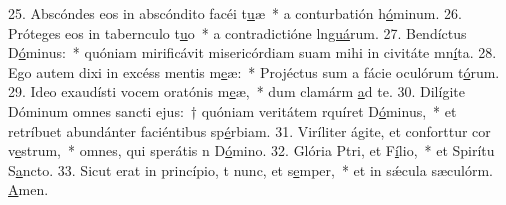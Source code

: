 25. Abscóndes eos in abscóndito facéi t\uline{u}æ~* a conturbatión h\uline{ó}minum.
26. Próteges eos in tabernculo t\uline{u}o~* a contradictióne ln\uline{guá}rum.
27. Bendíctus D\uline{ó}minus:~* quóniam mirificávit misericórdiam suam mihi in civitáte mn\uline{í}ta.
28. Ego autem dixi in excéss mentis m\uline{e}æ:~* Projéctus sum a fácie oculórum t\uline{ó}rum.
29. Ideo exaudísti vocem oratónis m\uline{e}æ,~* dum clamárm \uline{a}d te.
30. Dilígite Dóminum omnes sancti ejus:~† quóniam veritátem rquíret D\uline{ó}minus,~* et retríbuet abundánter faciéntibus sp\uline{é}rbiam.
31. Viríliter ágite, et conforttur cor v\uline{e}strum,~* omnes, qui sperátis n D\uline{ó}mino.
32. Glória Ptri, et F\uline{í}lio,~* et Spirítu S\uline{a}ncto.
33. Sicut erat in princípio, t nunc, et s\uline{e}mper,~* et in sǽcula sæculórm. \uline{A}men.
